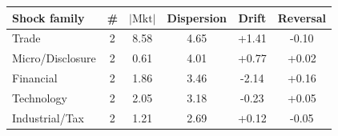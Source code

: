 \begin{tabular}{lccccc}
\toprule
Shock family & \# & $|\text{Mkt}|$ & Dispersion & Drift & Reversal \\
\midrule
Trade & 2 & 8.58 & 4.65 & +1.41 & -0.10 \\
Micro/Disclosure & 2 & 0.61 & 4.01 & +0.77 & +0.02 \\
Financial & 2 & 1.86 & 3.46 & -2.14 & +0.16 \\
Technology & 2 & 2.05 & 3.18 & -0.23 & +0.05 \\
Industrial/Tax & 2 & 1.21 & 2.69 & +0.12 & -0.05 \\
\bottomrule
\end{tabular}